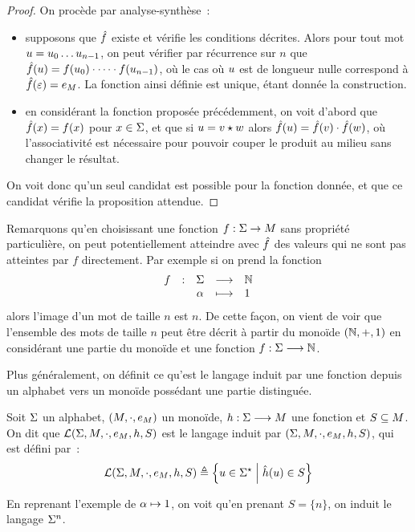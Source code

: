 \begin{proof}
  On procède par analyse-synthèse~:
  \begin{itemize}
  \item supposons que $\hat{f}$ existe et vérifie les conditions décrites.
    Alors pour tout mot $u = u_0\ldots u_{n-1}$, on peut vérifier
    par récurrence sur $n$ que
    $\hat{f}(u) = f(u_0)\mathbin{\cdot} \cdots \mathbin{\cdot} f(u_{n-1})$, où le cas où
    $u$ est de longueur nulle correspond à $\hat{f}(\varepsilon) = e_{M}$. La
    fonction ainsi définie est unique, étant donnée la construction.
  \item en considérant la fonction proposée précédemment, on voit d'abord que
    $\hat{f}(x) = f(x)$ pour $x\in \Sigma$, et que si $u=v\mathbin{\star}w$
    alors $\hat{f}(u) = \hat{f}(v)\mathbin{\cdot} \hat{f}(w)$, où
    l'associativité est nécessaire pour pouvoir couper le produit au milieu sans
    changer le résultat.
  \end{itemize}
  On voit donc qu'un seul candidat est possible pour la fonction donnée, et que
  ce candidat vérifie la proposition attendue.
\end{proof}

Remarquons qu'en choisissant une fonction $f : \Sigma \to M$ sans propriété
particulière, on peut potentiellement atteindre avec $\hat{f}$ des valeurs qui
ne sont pas atteintes par $f$ directement. Par exemple si on prend la fonction
\[\makeFun{f}{\ABA}{\bN}{\varla}{1}\]
alors l'image d'un mot de taille $n$ est $n$. De cette façon, on vient de voir
que l'ensemble des mots de taille $n$ peut être décrit à partir du monoïde
$(\mathbb N,+,1)$ en considérant une partie du monoïde et une fonction
$f : \displaystyle \Sigma \longrightarrow \mathbb N$.

Plus généralement, on définit ce qu'est le langage induit par une fonction
depuis un alphabet vers un monoïde possédant une partie distinguée.

\begin{definition}
  Soit $\Sigma$ un alphabet, $(M,\mathbin{\cdot},e_{M})$ un monoïde,
  $h : \displaystyle \Sigma \longrightarrow M$ une fonction et $S\subseteq M$. On dit
  que $\mathcal L(\Sigma,M,\mathbin{\cdot},e_{M},h,S)$ est le langage induit par
  $(\Sigma,M,\mathbin{\cdot},e_{M},h,S)$, qui est défini par~:
  \[\mathcal L(\Sigma,M,\mathbin{\cdot},e_{M},h,S)\triangleq
  \left\{ u\in\Sigma^{\star} \;\middle\vert\; \hat{h}(u)\in S \right\}\]
\end{definition}

\noindent
En reprenant l'exemple de $\alpha \mapsto 1$, on voit qu'en prenant $S = \{n\}$,
on induit le langage $\Sigma^n$.

